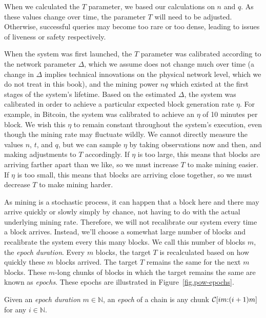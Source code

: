 When we calculated the $T$ parameter, we based our calculations on $n$ and $q$.
As these values change over time, the parameter $T$ will need to be adjusted.
Otherwise, successful queries may become too rare or too dense, leading
to issues of liveness or safety respectively.

When the system was first launched, the $T$ parameter was calibrated
according to the network parameter $\Delta$, which we assume does not
change much over time (a change in $\Delta$ implies technical innovations
on the physical network level, which we do not treat in this book),
and the mining power $nq$ which existed at the first stages of the
system's lifetime. Based on the estimated $\Delta$, the system
was calibrated in order to achieve a particular expected block
generation rate $\eta$. For example, in Bitcoin, the system was
calibrated to achieve an $\eta$ of 10 minutes per block.
We wish this $\eta$ to remain constant throughout the system's
execution, even though the mining rate may fluctuate wildly.
We cannot directly measure the values $n$, $t$, and $q$,
but we can sample $\eta$ by taking observations now and
then, and making adjustments to $T$ accordingly. If $\eta$
is too large, this means that blocks are arriving farther
apart than we like, so we must increase $T$ to make mining
easier. If $\eta$ is too small, this means that blocks
are arriving close together, so we must decrease $T$ to make
mining harder.

As mining is a stochastic process, it can happen that a block
here and there may arrive quickly or slowly simply by chance,
not having to do with the actual underlying mining rate. Therefore,
we will not recalibrate our system every time a block arrives.
Instead, we'll choose a somewhat large number of blocks
and recalibrate the system every this many blocks. We call this
number of blocks $m$, the \emph{epoch duration}. Every $m$
blocks, the target $T$ is recalculated based on how quickly
these $m$ blocks arrived. The target $T$ remains the same
for the next $m$ blocks. These $m$-long chunks of blocks
in which the target remains the same are known as \emph{epochs}.
These epochs are illustrated in Figure~\ref{fig.pow-epochs}.

\begin{definition}[Epoch]
  Given an \emph{epoch duration} $m \in \mathbb{N}$,
  an \emph{epoch} of a chain is any chunk $\mathcal{C}[im{:}(i + 1)m]$
  for any $i \in \mathbb{N}$.
\end{definition}

